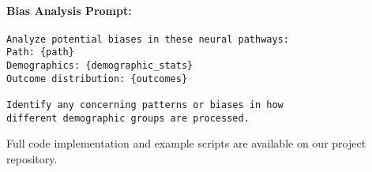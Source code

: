 \paragraph{Bias Analysis Prompt:}
\begin{verbatim}
Analyze potential biases in these neural pathways:
Path: {path}
Demographics: {demographic_stats}
Outcome distribution: {outcomes}

Identify any concerning patterns or biases in how
different demographic groups are processed.
\end{verbatim}

Full code implementation and example scripts are available on our project repository.
